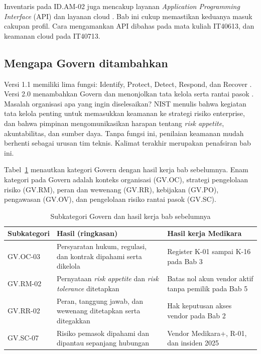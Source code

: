 Inventaris pada ID.AM-02 juga mencakup layanan \textit{Application Programming Interface} (API) dan
layanan cloud \cite{c06-nist-irefs}. Bab ini cukup memastikan keduanya masuk cakupan profil. Cara
mengamankan API dibahas pada mata kuliah IT40613, dan keamanan cloud pada IT40713.

\subsection*{Mengapa Govern ditambahkan}

Versi 1.1 memiliki lima fungsi: Identify, Protect, Detect, Respond, dan Recover
\cite{c06-nist-csf11}. Versi 2.0 menambahkan Govern dan menonjolkan tata kelola serta rantai pasok
\cite{nistcsf2}. Masalah organisasi apa yang ingin diselesaikan? NIST menulis bahwa kegiatan tata
kelola penting untuk memasukkan keamanan ke strategi risiko enterprise, dan bahwa pimpinan
mengomunikasikan harapan tentang \textit{risk appetite}, akuntabilitas, dan sumber daya. Tanpa fungsi
ini, penilaian keamanan mudah berhenti sebagai urusan tim teknis. Kalimat terakhir merupakan
penafsiran bab ini.

Tabel~\ref{tab:ch06-govern} menautkan kategori Govern dengan hasil kerja bab sebelumnya. Enam
kategori pada Govern adalah konteks organisasi (GV.OC), strategi pengelolaan risiko (GV.RM), peran
dan wewenang (GV.RR), kebijakan (GV.PO), pengawasan (GV.OV), dan pengelolaan risiko rantai pasok
(GV.SC).

\begin{table}[!htb]
  \centering\small
  \caption{Subkategori Govern dan hasil kerja bab sebelumnya}\label{tab:ch06-govern}
  \begin{tabularx}{\textwidth}{|>{\raggedright\arraybackslash}p{}|>{\raggedright\arraybackslash}X|>{\raggedright\arraybackslash}X|}
    \hline
    \textbf{Subkategori} & \textbf{Hasil (ringkasan)} & \textbf{Hasil kerja Medikara} \\ \hline
    GV.OC-03 & Persyaratan hukum, regulasi, dan kontrak dipahami serta dikelola & Register K-01
    sampai K-16 pada Bab 3 \\ \hline
    GV.RM-02 & Pernyataan \textit{risk appetite} dan \textit{risk tolerance} ditetapkan & Batas nol
    akun vendor aktif tanpa pemilik pada Bab 5 \\ \hline
    GV.RR-02 & Peran, tanggung jawab, dan wewenang ditetapkan serta ditegakkan & Hak keputusan akses
    vendor pada Bab 2 \\ \hline
    GV.SC-07 & Risiko pemasok dipahami dan dipantau sepanjang hubungan & Vendor Medikara+, R-01, dan
    insiden 2025 \\ \hline
  \end{tabularx}
\end{table}

